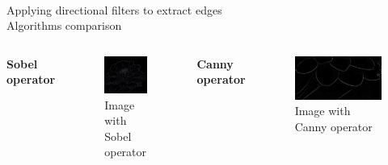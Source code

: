 \documentclass[accentcolor=tud4b,colorbacktitle,inverttitle,landscape,german,presentation,t]{tudbeamer}
\begin{document}
\begin{frame}{\\Applying directional filters to extract edges\\ \small{Algorithms comparison \cite{youtube}}}
\begin{columns}
\textbf{Sobel operator}
\begin{figure}
\includegraphics[scale=.45]{Sobel_2}
\caption{Image with Sobel operator }
\end{figure}
\textbf{Canny operator}
\vspace{1.2cm}
\begin{figure}
\includegraphics[scale=.22]{Canny_2}
\caption{Image with Canny operator }
\end{figure}

\end{columns}


\end{frame}
\end{document}
